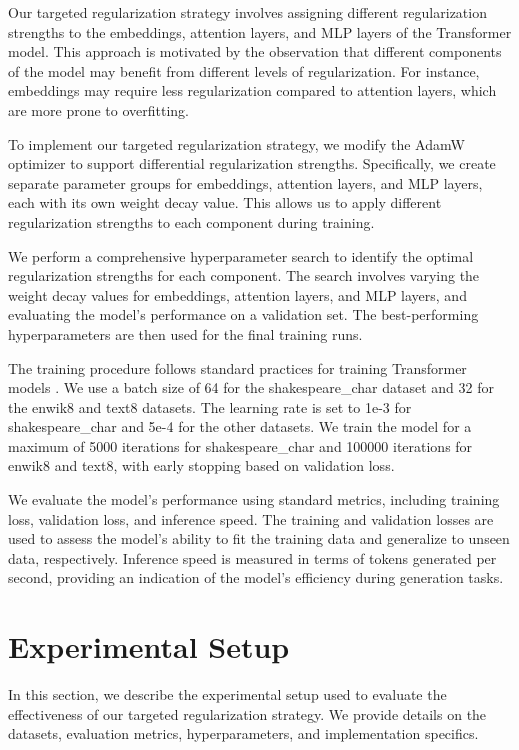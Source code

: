 \documentclass{article} %
\begin{document}
Our targeted regularization strategy involves assigning different regularization strengths to the embeddings, attention layers, and MLP layers of the Transformer model. This approach is motivated by the observation that different components of the model may benefit from different levels of regularization. For instance, embeddings may require less regularization compared to attention layers, which are more prone to overfitting.

To implement our targeted regularization strategy, we modify the AdamW optimizer \citep{loshchilov2017adamw} to support differential regularization strengths. Specifically, we create separate parameter groups for embeddings, attention layers, and MLP layers, each with its own weight decay value. This allows us to apply different regularization strengths to each component during training.

We perform a comprehensive hyperparameter search to identify the optimal regularization strengths for each component. The search involves varying the weight decay values for embeddings, attention layers, and MLP layers, and evaluating the model's performance on a validation set. The best-performing hyperparameters are then used for the final training runs.

The training procedure follows standard practices for training Transformer models \citep{vaswani2017attention}. We use a batch size of 64 for the shakespeare\_char dataset and 32 for the enwik8 and text8 datasets. The learning rate is set to 1e-3 for shakespeare\_char and 5e-4 for the other datasets. We train the model for a maximum of 5000 iterations for shakespeare\_char and 100000 iterations for enwik8 and text8, with early stopping based on validation loss.

We evaluate the model's performance using standard metrics, including training loss, validation loss, and inference speed. The training and validation losses are used to assess the model's ability to fit the training data and generalize to unseen data, respectively. Inference speed is measured in terms of tokens generated per second, providing an indication of the model's efficiency during generation tasks.

\section{Experimental Setup}
\label{sec:experimental}

In this section, we describe the experimental setup used to evaluate the effectiveness of our targeted regularization strategy. We provide details on the datasets, evaluation metrics, hyperparameters, and implementation specifics.
\end{document}
